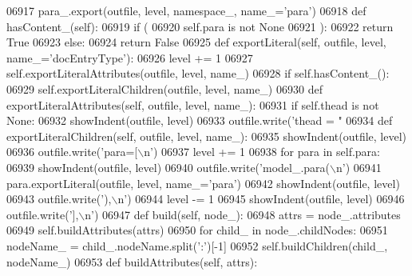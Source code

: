 \begin{DoxyCode}
{{{{{{{{{{{{{{{{{{{{{{{{{{{{{{{{{{{{{{{{{{{{{{{{{{{{{{{{{{{{{{{{{{{{{{{{{{{{{{{{{{{{{{{{{{{{{{{{{{{{{{{{{{{{{{{{{{{{{{{{{{{{{{{{{{{{{{{{{{{{{{{{{{{{{{{{{{{{{{{{{{{{{{{{{{{{{{{{{{{{{{{{{{{{{{{{{{{{{{{{{{{{{{{{{{{{{{{{{{{{{{{{{{{{{{{{{{{{{{{{{{{{{{{{{{{{{{{{{{{{{{{{{{{{{{{{{{{{{{{{{{{{{{{{{{{{{{{{{{{{{{{{{{{{{{{{{{{{{{{{{{{{{{{{{{{{{{{{{{{{{{{{{{{{{{{{{{{{{{{{{{{{{{{{{{{{{{{{{{{{{{{{{{{{{{{{{{{{{{{{{{{{{{{{{{{{{{{{{{{{{{{{{{{06917             para\_.export(outfile, level, namespace\_, name\_=\textcolor{stringliteral}{'para'})
06918     \textcolor{keyword}{def }hasContent_(self):
06919         \textcolor{keywordflow}{if} (
06920             self.para \textcolor{keywordflow}{is} \textcolor{keywordflow}{not} \textcolor{keywordtype}{None}
06921             ):
06922             \textcolor{keywordflow}{return} \textcolor{keyword}{True}
06923         \textcolor{keywordflow}{else}:
06924             \textcolor{keywordflow}{return} \textcolor{keyword}{False}
06925     \textcolor{keyword}{def }exportLiteral(self, outfile, level, name\_='docEntryType'):
06926         level += 1
06927         self.exportLiteralAttributes(outfile, level, name\_)
06928         \textcolor{keywordflow}{if} self.hasContent_():
06929             self.exportLiteralChildren(outfile, level, name\_)
06930     \textcolor{keyword}{def }exportLiteralAttributes(self, outfile, level, name\_):
06931         \textcolor{keywordflow}{if} self.thead \textcolor{keywordflow}{is} \textcolor{keywordflow}{not} \textcolor{keywordtype}{None}:
06932             showIndent(outfile, level)
06933             outfile.write(\textcolor{stringliteral}{'thead = "%
06934     \textcolor{keyword}{def }exportLiteralChildren(self, outfile, level, name\_):
06935         showIndent(outfile, level)
06936         outfile.write(\textcolor{stringliteral}{'para=[\(\backslash\)n'})
06937         level += 1
06938         \textcolor{keywordflow}{for} para \textcolor{keywordflow}{in} self.para:
06939             showIndent(outfile, level)
06940             outfile.write(\textcolor{stringliteral}{'model\_.para(\(\backslash\)n'})
06941             para.exportLiteral(outfile, level, name\_=\textcolor{stringliteral}{'para'})
06942             showIndent(outfile, level)
06943             outfile.write(\textcolor{stringliteral}{'),\(\backslash\)n'})
06944         level -= 1
06945         showIndent(outfile, level)
06946         outfile.write(\textcolor{stringliteral}{'],\(\backslash\)n'})
06947     \textcolor{keyword}{def }build(self, node\_):
06948         attrs = node\_.attributes
06949         self.buildAttributes(attrs)
06950         \textcolor{keywordflow}{for} child\_ \textcolor{keywordflow}{in} node\_.childNodes:
06951             nodeName\_ = child\_.nodeName.split(\textcolor{stringliteral}{':'})[-1]
06952             self.buildChildren(child\_, nodeName\_)
06953     \textcolor{keyword}{def }buildAttributes(self, attrs):
}}}}}}}}}}}}}}}}}}}}}}}}}}}}}}}}}}}}}}}}}}}}}}}}}}}}}}}}}}}}}}}}}}}}}}}}}}}}}}}}}}}}}}}}}}}}}}}}}}}}}}}}}}}}}}}}}}}}}}}}}}}}}}}}}}}}}}}}}}}}}}}}}}}}}}}}}}}}}}}}}}}}}}}}}}}}}}}}}}}}}}}}}}}}}}}}}}}}}}}}}}}}}}}}}}}}}}}}}}}}}}}}}}}}}}}}}}}}}}}}}}}}}}}}}}}}}}}}}}}}}}}}}}}}}}}}}}}}}}}}}}}}}}}}}}}}}}}}}}}}}}}}}}}}}}}}}}}}}}}}}}}}}}}}}}}}}}}}}}}}}}}}}}}}}}}}}}}}}}}}}}}}}}}}}}}}}}}}}}}}}}}}}}}}}}}}}}}}}}}}}}}}}}}}}}}}}}}}}}}}}}}}}}}}
\end{DoxyCode}
